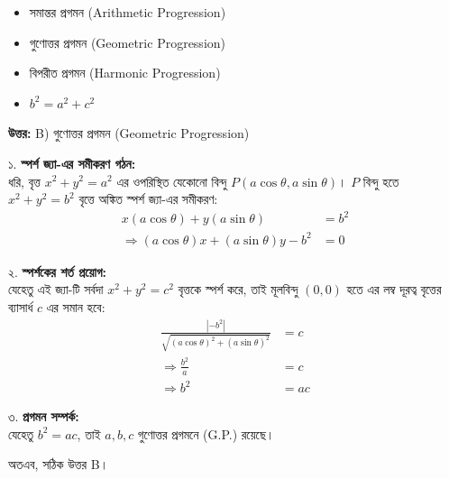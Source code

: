 \documentclass[12pt, a4paper]{article}
\begin{document}
\begin{itemize}[label={}, leftmargin=1cm, itemsep=0.5em]
    \item[\textbf{A)}] সমান্তর প্রগমন (Arithmetic Progression)
    \item[\textbf{B)}] গুণোত্তর প্রগমন (Geometric Progression)
    \item[\textbf{C)}] বিপরীত প্রগমন (Harmonic Progression)
    \item[\textbf{D)}] $b^2 = a^2 + c^2$
\end{itemize}

\vspace{0.5em}
\begin{tcolorbox}[answerbox]
    \textbf{\color{success} উত্তর:} B) গুণোত্তর প্রগমন (Geometric Progression)
\end{tcolorbox}
\vspace{1em}

\begin{tcolorbox}[solutionbox={সমাধান (Solution)}]
    \noindent
    ১. \textbf{স্পর্শ জ্যা-এর সমীকরণ গঠন:} \\
    ধরি, বৃত্ত $x^2 + y^2 = a^2$ এর ওপরিস্থিত যেকোনো বিন্দু $P(a\cos\theta, a\sin\theta)$। $P$ বিন্দু হতে $x^2 + y^2 = b^2$ বৃত্তে অঙ্কিত স্পর্শ জ্যা-এর সমীকরণ:
    \begin{align*}
        x(a\cos\theta) + y(a\sin\theta) &= b^2 \\
        \Rightarrow (a\cos\theta)x + (a\sin\theta)y - b^2 &= 0
    \end{align*}
    
    \vspace{0.5em}
    ২. \textbf{স্পর্শকের শর্ত প্রয়োগ:} \\
    যেহেতু এই জ্যা-টি সর্বদা $x^2 + y^2 = c^2$ বৃত্তকে স্পর্শ করে, তাই মূলবিন্দু $(0, 0)$ হতে এর লম্ব দূরত্ব বৃত্তের ব্যাসার্ধ $c$ এর সমান হবে:
    \begin{align*}
        \frac{|-b^2|}{\sqrt{(a\cos\theta)^2 + (a\sin\theta)^2}} &= c \\
        \Rightarrow \frac{b^2}{a} &= c \\
        \Rightarrow b^2 &= ac
    \end{align*}
    
    \vspace{0.5em}
    ৩. \textbf{প্রগমন সম্পর্ক:} \\
    যেহেতু $b^2 = ac$, তাই $a, b, c$ গুণোত্তর প্রগমনে (G.P.) রয়েছে।
    
    \vspace{0.5em}
    অতএব, সঠিক উত্তর B।
\end{tcolorbox}
\end{document}
